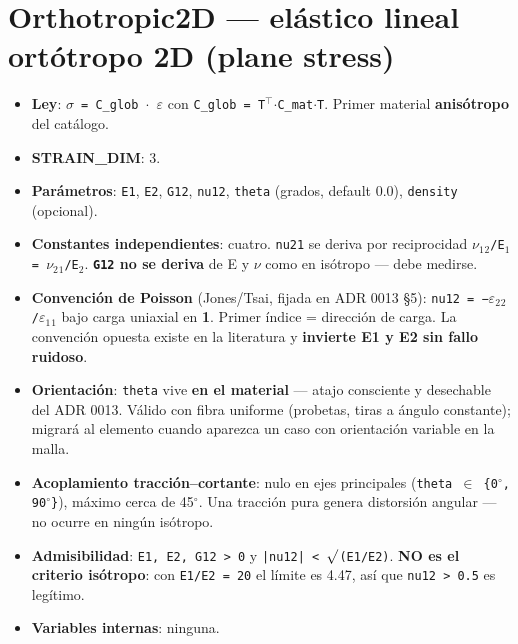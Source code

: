 \documentclass[11pt,letterpaper,oneside]{report}
\begin{document}
\section{Orthotropic2D --- elástico lineal \textbf{ortótropo} 2D (plane stress)}

\begin{itemize}
  \item \textbf{Ley}: \texttt{\ensuremath{\sigma} = C\_glob \ensuremath{\cdot} \ensuremath{\varepsilon}} con \texttt{C\_glob = T\ensuremath{^{\top}}\ensuremath{\cdot}C\_mat\ensuremath{\cdot}T}. Primer material \textbf{anisótropo} del catálogo.
  \item \textbf{STRAIN\_DIM}: 3.
  \item \textbf{Parámetros}: \texttt{E1}, \texttt{E2}, \texttt{G12}, \texttt{nu12}, \texttt{theta} (grados, default 0.0), \texttt{density} (opcional).
  \item \textbf{Constantes independientes}: cuatro. \texttt{nu21} se deriva por reciprocidad \texttt{\ensuremath{\nu}\ensuremath{_{1}}\ensuremath{_{2}}/E\ensuremath{_{1}} = \ensuremath{\nu}\ensuremath{_{2}}\ensuremath{_{1}}/E\ensuremath{_{2}}}. \textbf{\texttt{G12} no se deriva} de E y \ensuremath{\nu} como en isótropo --- debe medirse.
  \item \textbf{Convención de Poisson} (Jones/Tsai, fijada en ADR 0013 §5): \texttt{nu12 = −\ensuremath{\varepsilon}\ensuremath{_{2}}\ensuremath{_{2}}/\ensuremath{\varepsilon}\ensuremath{_{1}}\ensuremath{_{1}}} bajo carga uniaxial en \textbf{1}. Primer índice = dirección de carga. La convención opuesta existe en la literatura y \textbf{invierte E1 y E2 sin fallo ruidoso}.
  \item \textbf{Orientación}: \texttt{theta} vive \textbf{en el material} --- atajo consciente y desechable del ADR 0013. Válido con fibra uniforme (probetas, tiras a ángulo constante); migrará al elemento cuando aparezca un caso con orientación variable en la malla.
  \item \textbf{Acoplamiento tracción--cortante}: nulo en ejes principales (\texttt{theta \ensuremath{\in} \{0\ensuremath{^{\circ}}, 90\ensuremath{^{\circ}}\}}), máximo cerca de 45\ensuremath{^{\circ}}. Una tracción pura genera distorsión angular --- no ocurre en ningún isótropo.
  \item \textbf{Admisibilidad}: \texttt{E1, E2, G12 > 0} y \texttt{|nu12| < \ensuremath{\surd}(E1/E2)}. \textbf{NO es el criterio isótropo}: con \texttt{E1/E2 = 20} el límite es 4.47, así que \texttt{nu12 > 0.5} es legítimo.
  \item \textbf{Variables internas}: ninguna.

\end{itemize}
\end{document}
